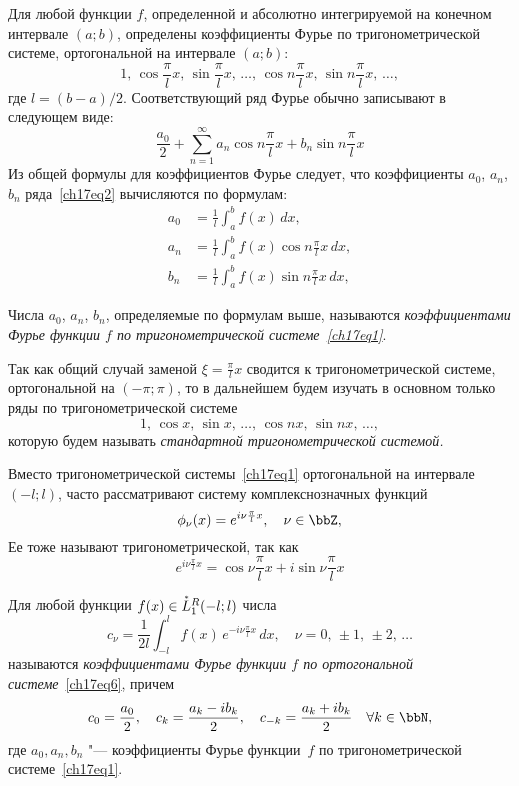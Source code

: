 Для любой функции $f$, определенной и абсолютно интегрируемой на конечном интервале $(a;b)$, определены коэффициенты Фурье по тригонометрической системе, ортогональной на интервале $(a;b)$:
\begin{equation} \label{ch17eq1}
1,\, \cos \frac{\pi}{l}x,\, \sin \frac{\pi}{l}x,\,\ldots,\,\cos n\frac{\pi}{l}x,\, \sin n\frac{\pi}{l}x,\,\ldots,
\end{equation}
где $l = (b - a)/2$. Соответствующий ряд Фурье обычно записывают в следующем виде:
\begin{equation} \label{ch17eq2}
\frac{a_0}{2} + \sum_{n = 1}^{\infty} a_{n} \cos n\frac{\pi}{l}x + b_{n} \sin n\frac{\pi}{l}x
\end{equation}
Из общей формулы для коэффициентов Фурье следует, что коэффициенты $a_0$, $a_n$, $b_n$ ряда~\eqref{ch17eq2} вычисляются по формулам:
\begin{align} \label{ch17eq3}
a_0 &= \frac{1}{l} \int_{a}^{b} f(x)\,dx,\\
a_n &= \frac{1}{l} \int_{a}^{b} f(x)\cos n\frac{\pi}{l}x\, dx,\\
b_n &= \frac{1}{l} \int_{a}^{b} f(x)\sin n\frac{\pi}{l}x\, dx,
\end{align}

\begin{defn}
Числа $a_0$, $a_n$, $b_n$, определяемые по формулам выше, называются \textit{коэффициентами Фурье функции $f$ по тригонометрической системе~\eqref{ch17eq1}}.
\end{defn}

Так как общий случай заменой $\xi = \frac{\pi}{l} x$ сводится к тригонометрической системе, ортогональной на $(-\pi;\pi)$, то в дальнейшем будем изучать в основном только ряды по тригонометрической системе
$$
1,\, \cos x,\, \sin x,\,\ldots,\,\cos nx,\, \sin nx,\,\ldots,
$$
которую будем называть \textit{стандартной тригонометрической системой.}

Вместо тригонометрической системы~\eqref{ch17eq1} ортогональной на интервале~$(-l;l)$, часто рассматривают систему комплекснозначных функций
\begin{equation} \label{ch17eq6}
\phi_{\nu}(x) = e^{i\nu\frac{\pi}{l}x},\quad \nu \in \bbZ,
\end{equation}
Ее тоже называют тригонометрической, так как
$$
e^{i\nu\frac{\pi}{l}x} = \cos \nu\frac{\pi}{l}x + i \sin \nu\frac{\pi}{l}x
$$
\begin{defn}
Для любой функции $f(x) \in \accentset{*}{L}^{R}_1(-l;l)$ числа
\begin{equation}
c_{\nu} = \frac{1}{2l} \int_{-l}^{l} f(x)\, e^{-i\nu\frac{\pi}{l}x}\,dx,\quad \nu = 0,\, \pm 1,\, \pm 2,\,\ldots
\end{equation}
называются \textit{коэффициентами Фурье функции $f$ по ортогональной системе}~\eqref{ch17eq6}, причем
\begin{equation}\label{2018:ch17:eq15}
c_0 = \frac{a_0}{2}, \quad c_{k} = \frac{a_k - ib_k}{2}, \quad c_{-k} = \frac{a_k + ib_k}{2} \quad \forall k \in \bbN,
\end{equation}
где $a_0, a_n, b_n$ "--- коэффициенты Фурье функции~$f$ по тригонометрической системе~\eqref{ch17eq1}.
\end{defn}

